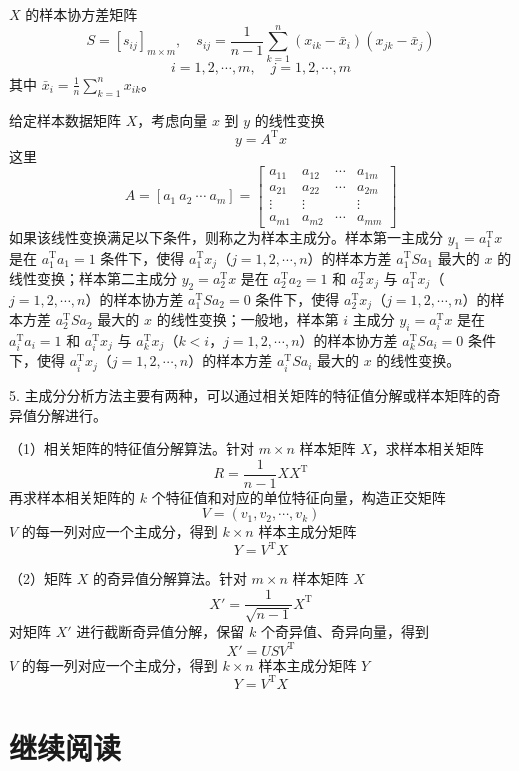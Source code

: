 \documentclass[UTF8, 12pt, fontset=fandol, oneside]{ctexart}
\begin{document}
$X$ 的样本协方差矩阵
\[
S=[s_{ij}]_{m\times m},\quad
s_{ij}=\frac{1}{n-1}\sum_{k=1}^n(x_{ik}-\bar x_i)(x_{jk}-\bar x_j)
\]
\[
i=1,2,\cdots,m,\quad j=1,2,\cdots,m
\]
其中 $\bar x_i=\frac{1}{n}\sum_{k=1}^n x_{ik}$。

给定样本数据矩阵 $X$，考虑向量 $x$ 到 $y$ 的线性变换
\[
y=A^{\mathrm{T}}x
\]
这里
\[
A=[a_1\ a_2\ \cdots\ a_m]=
\begin{bmatrix}
a_{11} & a_{12} & \cdots & a_{1m}\\
a_{21} & a_{22} & \cdots & a_{2m}\\
\vdots & \vdots & & \vdots\\
a_{m1} & a_{m2} & \cdots & a_{mm}
\end{bmatrix}
\]
如果该线性变换满足以下条件，则称之为样本主成分。样本第一主成分 $y_1=a_1^{\mathrm{T}}x$ 是在 $a_1^{\mathrm{T}}a_1=1$ 条件下，使得 $a_1^{\mathrm{T}}x_j$（$j=1,2,\cdots,n$）的样本方差 $a_1^{\mathrm{T}}Sa_1$ 最大的 $x$ 的线性变换；样本第二主成分 $y_2=a_2^{\mathrm{T}}x$ 是在 $a_2^{\mathrm{T}}a_2=1$ 和 $a_2^{\mathrm{T}}x_j$ 与 $a_1^{\mathrm{T}}x_j$（$j=1,2,\cdots,n$）的样本协方差 $a_1^{\mathrm{T}}Sa_2=0$ 条件下，使得 $a_2^{\mathrm{T}}x_j$（$j=1,2,\cdots,n$）的样本方差 $a_2^{\mathrm{T}}Sa_2$ 最大的 $x$ 的线性变换；一般地，样本第 $i$ 主成分 $y_i=a_i^{\mathrm{T}}x$ 是在 $a_i^{\mathrm{T}}a_i=1$ 和 $a_i^{\mathrm{T}}x_j$ 与 $a_k^{\mathrm{T}}x_j$（$k<i$，$j=1,2,\cdots,n$）的样本协方差 $a_k^{\mathrm{T}}Sa_i=0$ 条件下，使得 $a_i^{\mathrm{T}}x_j$（$j=1,2,\cdots,n$）的样本方差 $a_i^{\mathrm{T}}Sa_i$ 最大的 $x$ 的线性变换。

5. 主成分分析方法主要有两种，可以通过相关矩阵的特征值分解或样本矩阵的奇异值分解进行。

（1）相关矩阵的特征值分解算法。针对 $m\times n$ 样本矩阵 $X$，求样本相关矩阵
\[
R=\frac{1}{n-1}XX^{\mathrm{T}}
\]
再求样本相关矩阵的 $k$ 个特征值和对应的单位特征向量，构造正交矩阵
\[
V=(v_1,v_2,\cdots,v_k)
\]
$V$ 的每一列对应一个主成分，得到 $k\times n$ 样本主成分矩阵
\[
Y=V^{\mathrm{T}}X
\]

（2）矩阵 $X$ 的奇异值分解算法。针对 $m\times n$ 样本矩阵 $X$
\[
X'=\frac{1}{\sqrt{n-1}}X^{\mathrm{T}}
\]
对矩阵 $X'$ 进行截断奇异值分解，保留 $k$ 个奇异值、奇异向量，得到
\[
X'=USV^{\mathrm{T}}
\]
$V$ 的每一列对应一个主成分，得到 $k\times n$ 样本主成分矩阵 $Y$
\[
Y=V^{\mathrm{T}}X
\]

\section*{继续阅读}
\end{document}
